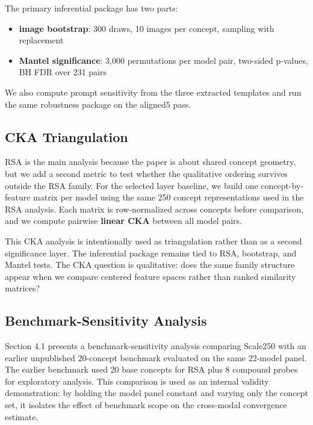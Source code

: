\documentclass[10pt]{article}
\providecommand{\tightlist}{%
  \setlength{\itemsep}{0pt}\setlength{\parskip}{0pt}}
\begin{document}
The primary inferential package has two parts:

\begin{itemize}
\tightlist
\item
  \textbf{image bootstrap}: 300 draws, 10 images per concept, sampling
  with replacement
\item
  \textbf{Mantel significance}: 3,000 permutations per model pair,
  two-sided p-values, BH FDR over 231 pairs
\end{itemize}

We also compute prompt sensitivity from the three extracted templates
and run the same robustness package on the aligned5 pass.

\subsection{CKA Triangulation}\label{cka-triangulation}

RSA is the main analysis because the paper is about shared concept
geometry, but we add a second metric to test whether the qualitative
ordering survives outside the RSA family. For the selected layer
baseline, we build one concept-by-feature matrix per model using the
same 250 concept representations used in the RSA analysis. Each matrix
is row-normalized across concepts before comparison, and we compute
pairwise \textbf{linear CKA} between all model pairs.

This CKA analysis is intentionally used as triangulation rather than as
a second significance layer. The inferential package remains tied to
RSA, bootstrap, and Mantel tests. The CKA question is qualitative: does
the same family structure appear when we compare centered feature spaces
rather than ranked similarity matrices?

\subsection{Benchmark-Sensitivity
Analysis}\label{benchmark-sensitivity-analysis}

Section 4.1 presents a benchmark-sensitivity analysis comparing Scale250
with an earlier unpublished 20-concept benchmark evaluated on the same
22-model panel. The earlier benchmark used 20 base concepts for RSA plus
8 compound probes for exploratory analysis. This comparison is used as
an internal validity demonstration: by holding the model panel constant
and varying only the concept set, it isolates the effect of benchmark
scope on the cross-modal convergence estimate.
\end{document}
